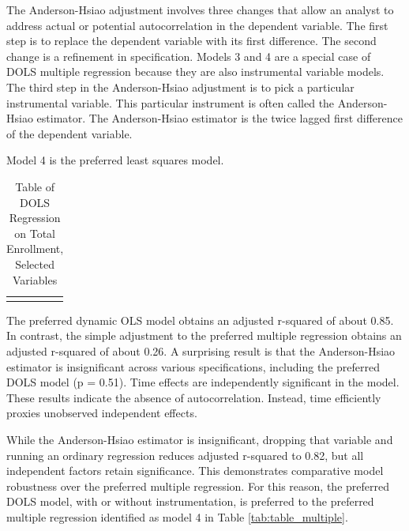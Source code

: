 \documentclass[review]{elsarticle}
\begin{document}
The Anderson-Hsiao adjustment involves three changes that allow an analyst to address actual or potential autocorrelation in the dependent variable.
The first step is to replace the dependent variable with its first difference.
The second change is a refinement in specification.
Models 3 and 4 are a special case of DOLS multiple regression because they are also instrumental variable models.
The third step in the Anderson-Hsiao adjustment is to pick a particular instrumental variable.
This particular instrument is often called the Anderson-Hsiao estimator.
The Anderson-Hsiao estimator is the twice lagged first difference of the dependent variable.



Model 4 is the preferred least squares model.

\begin{table}
    \caption{Table of DOLS Regression on Total Enrollment, Selected Variables}
    \begin{tabularx}{\textwidth}{X}
        \centering
        
    \end{tabularx}
    \label{tab:table_dols}
\end{table}

The preferred dynamic OLS model obtains an adjusted r-squared of about 0.85.
In contrast, the simple adjustment to the preferred multiple regression
obtains an adjusted r-squared of about 0.26.
A surprising result is that the Anderson-Hsiao estimator is insignificant
across various specifications, including the preferred DOLS model (p = 0.51).
Time effects are independently significant in the model.
These results indicate the absence of autocorrelation.
Instead, time efficiently proxies unobserved independent effects.

While the Anderson-Hsiao estimator is insignificant,
dropping that variable and running an ordinary regression reduces adjusted r-squared to 0.82,
but all independent factors retain significance.
This demonstrates comparative model robustness over the preferred multiple regression.
For this reason, the preferred DOLS model, with or without instrumentation,
is preferred to the preferred multiple regression identified as
model 4 in Table \ref{tab:table_multiple}.
\end{document}
